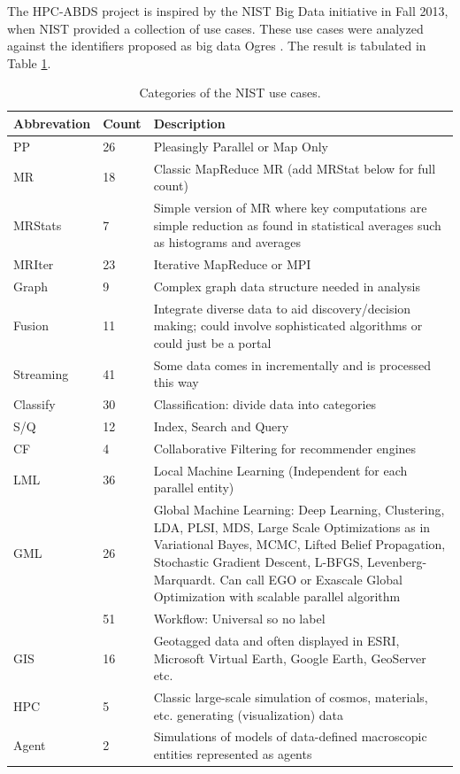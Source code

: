 \documentclass[runningheads,a4paper]{llncs}
\begin{document}
The HPC-ABDS project is inspired by the NIST Big Data initiative in Fall 2013, when NIST provided a collection of use cases. These use cases were analyzed against the identifiers proposed as big data Ogres \cite{fox2014towards}. The result is tabulated in Table \ref{table:NIST_vs_ogres}.
\begin{table}
	\centering
	\caption{Categories of the NIST use cases.}
	\begin{tabular}{ |p{2cm}|p{1.5cm}|p{8cm}|  }
		\hline
		Abbrevation & Count & Description \\
		\hline
		PP & 26 & Pleasingly Parallel or Map Only \\
		\hline
		MR & 18 & Classic MapReduce MR (add MRStat below for full count) \\
		\hline
		MRStats & 7 & Simple version of MR where key computations are simple reduction as found in
statistical averages such as histograms and averages \\
\hline
MRIter & 23 & Iterative MapReduce or MPI \\
\hline
Graph & 9 & Complex graph data structure needed in analysis \\
\hline
Fusion & 11 & Integrate diverse data to aid discovery/decision making; could involve sophisticated
algorithms or could just be a portal \\
\hline
Streaming & 41 & Some data comes in incrementally and is processed this way \\
\hline
Classify & 30 & Classification: divide data into categories\\
\hline
S/Q & 12 & Index, Search and Query\\
\hline
CF & 4 & Collaborative Filtering for recommender engines \\
\hline
LML & 36 & Local Machine Learning (Independent for each parallel entity) \\
\hline
GML & 26 & Global Machine Learning: Deep Learning, Clustering, LDA, PLSI, MDS, Large
Scale Optimizations as in Variational Bayes, MCMC, Lifted Belief Propagation,
Stochastic Gradient Descent, L-BFGS, Levenberg-Marquardt. Can call EGO or
Exascale Global Optimization with scalable parallel algorithm \\
\hline
 & 51 & Workflow: Universal so no label \\
\hline 
 GIS & 16 & Geotagged data and often displayed in ESRI, Microsoft Virtual Earth, Google
Earth, GeoServer etc. \\
\hline
HPC & 5 & Classic large-scale simulation of cosmos, materials, etc. generating (visualization)
data \\
\hline
Agent & 2 & Simulations of models of data-defined macroscopic entities represented as agents \\
\hline

	\end{tabular}
	\label{table:NIST_vs_ogres}
\end{table}
\end{document}
